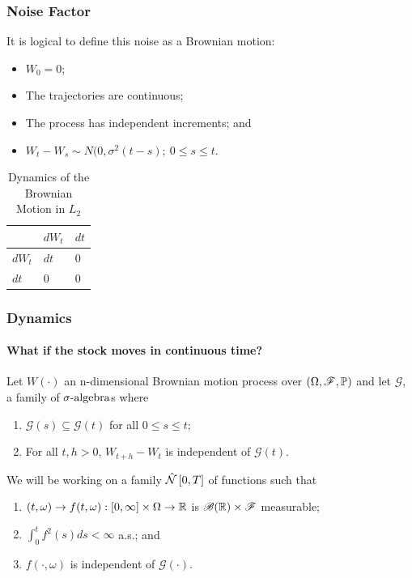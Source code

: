 \documentclass{beamer}
\begin{document}
\begin{frame}
\frametitle{Noise Factor}
	It is logical to define this noise as a Brownian motion:
	\begin{definition}
	\begin{itemize}
		\item $W_0 = 0$;
		\item The trajectories are continuous; 
		\item The process has independent increments; and
		\item $W_t - W_s \sim N(0, \sigma^2(t - s); \ 0 \leq s \leq t$.
	\end{itemize}
	\end{definition}
	
\begin{table}
\centering
\label{table:bm-property}
\begin{tabular}{l|ll}
       & $dW_t$ & $dt$ \\
       \hline
$dW_t$ & $dt$   & 0    \\
$dt$   & 0      & 0   
\end{tabular}
\caption{Dynamics of the Brownian Motion in $L_2$}
\end{table}
\end{frame}

\begin{frame}
\frametitle{Dynamics}
\framesubtitle{What if the stock moves in continuous time?}
Let $W(\cdot)$ an n-dimensional Brownian motion process over $(\Omega, \mathscr{F}, \mathbb{P})$ and let $\mathscr{G}$, a family of $\sigma\text{-algebra}$s where
	\begin{enumerate}
		\item $\mathscr{G}(s) \subseteq \mathscr{G}(t)$ for all $0\leq s \leq t$;
		\item For all $t, h > 0$, $W_{t+h} - W_t$ is independent of $\mathscr{G}(t)$.
	\end{enumerate}
	We will be working on a family $\Nhatfam{0}{T}$ of functions such that
	\begin{definition}[$\Nhatfam{0}{T}$]
	\begin{enumerate}
		\item $(t, \omega) \to f(t, \omega):[0, \infty]\times\Omega \to \mathbb{R}$ is $\mathscr{B}(\mathbb{R})\times\mathscr{F}$ measurable;
		\item $\int_0^t f^2(s) ds < \infty$ a.s.; and
		\item $f(\cdot, \omega)$ is independent of $\mathscr{G}(\cdot)$.
	\end{enumerate}
\end{definition}
\end{frame}
\end{document}
